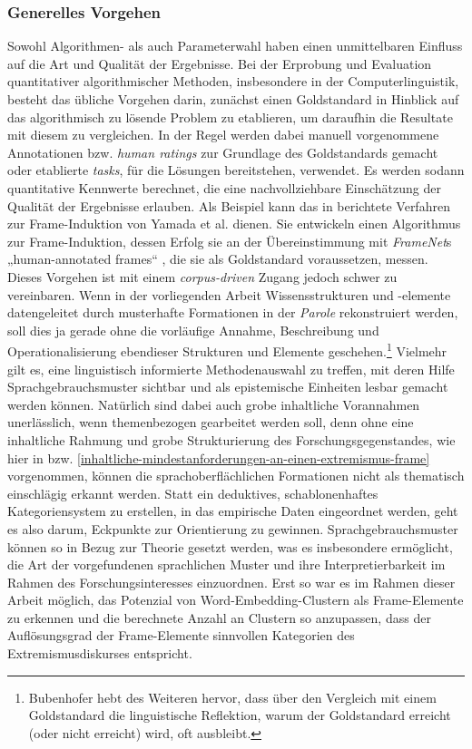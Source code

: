 \subsubsection{Generelles Vorgehen}\label{generelles-vorgehen}

Sowohl Algorithmen- als auch Parameterwahl haben einen unmittelbaren Einfluss auf die Art und Qualität der Ergebnisse. Bei der Erprobung und Evaluation quantitativer algorithmischer Methoden, insbesondere in der Computerlinguistik, besteht das übliche Vorgehen darin, zunächst einen Goldstandard in Hinblick auf das algorithmisch zu lösende Problem zu etablieren, um daraufhin die Resultate mit diesem zu vergleichen. In der Regel werden dabei manuell vorgenommene Annotationen bzw. \emph{human ratings} zur Grundlage des Goldstandards gemacht oder etablierte \emph{tasks}, für die Lösungen bereitstehen, verwendet. Es werden sodann quantitative Kennwerte berechnet, die eine nachvollziehbare Einschätzung der Qualität der Ergebnisse erlauben. Als Beispiel kann das in  berichtete Verfahren zur Frame-Induktion von Yamada et al. \autocite*{yamadaSemanticFrameInduction2021} dienen. Sie entwickeln einen Algorithmus zur Frame-Induktion, dessen Erfolg sie an der Übereinstimmung mit \emph{FrameNet}s „human-annotated frames`` \autocite*[814]{yamadaSemanticFrameInduction2021}, die sie als Goldstandard voraussetzen, messen. Dieses Vorgehen ist mit einem \emph{corpus-driven} Zugang jedoch schwer zu vereinbaren. Wenn in der vorliegenden Arbeit Wissensstrukturen und -elemente datengeleitet durch musterhafte Formationen in der \emph{Parole} rekonstruiert werden, soll dies ja gerade ohne die vorläufige Annahme, Beschreibung und Operationalisierung ebendieser Strukturen und Elemente geschehen.\footnote{Bubenhofer \autocite*{bubenhoferWennLinguistikKorpuslinguistik2018} hebt des Weiteren hervor, dass über den Vergleich mit einem Goldstandard die linguistische Reflektion, warum der Goldstandard erreicht (oder nicht erreicht) wird, oft ausbleibt.} Vielmehr gilt es, eine linguistisch informierte Methodenauswahl zu treffen, mit deren Hilfe Sprachgebrauchsmuster sichtbar und als epistemische Einheiten lesbar gemacht werden können. Natürlich sind dabei auch grobe inhaltliche Vorannahmen unerlässlich, wenn themenbezogen gearbeitet werden soll, denn ohne eine inhaltliche Rahmung und grobe Strukturierung des Forschungsgegenstandes, wie hier in  bzw. \ref{inhaltliche-mindestanforderungen-an-einen-extremismus-frame} vorgenommen, können die sprachoberflächlichen Formationen nicht als thematisch einschlägig erkannt werden. Statt ein deduktives, schablonenhaftes Kategoriensystem zu erstellen, in das empirische Daten eingeordnet werden, geht es also darum, Eckpunkte zur Orientierung zu gewinnen. Sprachgebrauchsmuster können so in Bezug zur Theorie gesetzt werden, was es insbesondere ermöglicht, die Art der vorgefundenen sprachlichen Muster und ihre Interpretierbarkeit im Rahmen des Forschungsinteresses einzuordnen. Erst so war es im Rahmen dieser Arbeit möglich, das Potenzial von Word-Embedding-Clustern als Frame-Elemente zu erkennen und die berechnete Anzahl an Clustern so anzupassen, dass der Auflösungsgrad der Frame-Elemente sinnvollen Kategorien des Extremismusdiskurses entspricht.

